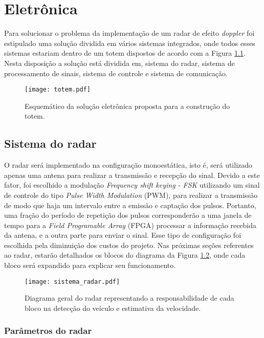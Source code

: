 
\chapter{Eletrônica}

Para solucionar o problema da implementação de um radar de efeito \emph{doppler}  foi estipulado uma solução dividida em vários sistemas integrados, onde todos esses sistemas estariam dentro de um totem dispostos de acordo com a Figura \ref{esquematico1}. Nesta disposição a solução está dividida em, sistema do radar,  sistema de processamento de sinais, sistema de controle e sistema de comunicação.


\begin{figure}[H]
    \centering
    \texttt{[image: totem.pdf]}
    \caption{Esquemático da solução eletrônica proposta para a construção do totem. }
    \label{esquematico1}
\end{figure}

\section{Sistema do radar}

O radar será implementado na configuração monoestática, isto é, será utilizado apenas uma  antena para realizar a transmissão e recepção do sinal. Devido a este fator, foi escolhido a modulação  \emph{ Frequency shift keying - FSK} utilizando um sinal de controle do tipo \emph{Pulse Width Modulation} (PWM), para realizar a transmissão de modo que haja um intervalo entre a emissão e captação dos pulsos. Portanto, uma fração do período de repetição dos pulsos corresponderão a uma janela de tempo para a \emph{Field Programable Array} (FPGA) processar a informação recebida da antena, e a outra parte para enviar o sinal. Esse tipo de configuração foi escolhida pela diminuição dos custos do projeto.
Nas próximas seções referentes ao radar, estarão detalhados os blocos do diagrama da Figura \ref{processos_geral_radar}, onde cada bloco será expandido para explicar seu funcionamento.

\begin{figure}[H]
    \centering
    \texttt{[image: sistema\_radar.pdf]}
    \caption{Diagrama geral do radar representando a responsabilidade de cada bloco na detecção do veículo e estimativa da velocidade.}
    \label{processos_geral_radar}
\end{figure}

\subsection{Parâmetros do radar}

